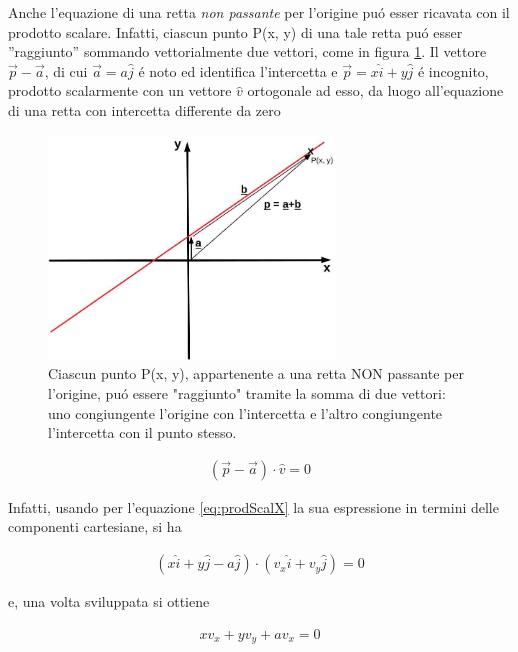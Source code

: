 \documentclass[17pt]{extarticle}
\begin{document}
Anche l'equazione di una retta \emph{non passante} per l'origine pu\'o esser ricavata con il prodotto scalare. Infatti, ciascun punto P(x, y) di una tale retta pu\'o esser ''raggiunto'' sommando vettorialmente due vettori, come in figura \ref{fig:rettaNONpassOrig}. Il vettore $\vec{p} - \vec{a}$, di cui $\vec{a} = a\hat{j}$ \'e noto ed identifica l'intercetta e $\vec{p} = x\hat{i} + y\hat{j}$ \'e incognito, prodotto scalarmente con un vettore $\hat{v}$ ortogonale ad esso, da luogo all'equazione di una retta con intercetta differente da zero



\begin{figure}[b!]		
	\centering
   	\includegraphics[width=3.0in]{rettaNONpassOrig.jpg}		%
  	\caption{Ciascun punto P(x, y), appartenente a una retta NON passante per l'origine, pu\'o essere "raggiunto" tramite la somma di due vettori: uno congiungente l'origine con l'intercetta e l'altro congiungente l'intercetta con il punto stesso.}
   	\label{fig:rettaNONpassOrig}
\end{figure}


\begin{eqnarray}\label{eq:prodScalX}
	(\vec{p} -\vec{a})\cdot \hat{v} = 0
\end{eqnarray}

Infatti, usando per l'equazione \ref{eq:prodScalX} la sua espressione in termini delle componenti cartesiane, si ha

\begin{eqnarray}
	(x\hat{i} + y\hat{j} -a\hat{j})\cdot (v_x\hat{i} + v_y\hat{j} ) = 0
\end{eqnarray}

e, una volta sviluppata si ottiene

\begin{eqnarray}\label{eq:Rettau}
	xv_x+yv_y + av_x = 0
\end{eqnarray}
\end{document}

